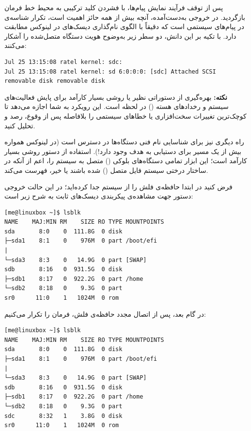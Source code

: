 پس از توقف فرآیند نمایش پیام‌ها، با فشردن کلید ترکیبی  به محیط خط فرمان بازگردید. در خروجی به‌دست‌آمده، آنچه بیش از همه حائز اهمیت است، تکرار شناسه‌ی \cmd{[sdc]} در پیام‌های سیستمی است که دقیقاً با الگوی نام‌گذاری دیسک‌های  در لینوکس مطابقت دارد. با تکیه بر این دانش، دو سطر زیر به‌وضوح هویت دستگاه متصل‌شده را آشکار می‌کنند:

\begin{latin}
\begin{lstlisting}
Jul 25 13:15:08 ratel kernel: sdc:
Jul 25 13:15:08 ratel kernel: sd 6:0:0:0: [sdc] Attached SCSI
removable disk removable disk
\end{lstlisting}
\end{latin}

\begin{note}
\textbf{نکته:} بهره‌گیری از دستوراتی نظیر  یا  روشی بسیار کارآمد برای پایش فعالیت‌های سیستم و رخدادهای هسته () در لحظه است. این رویکرد به شما اجازه می‌دهد تا کوچک‌ترین تغییرات سخت‌افزاری یا خطاهای سیستمی را بلافاصله پس از وقوع، رصد و تحلیل کنید.
\end{note}

راه دیگری نیز برای شناسایی نام فنی دستگاه‌ها در دسترس است (در لینوکس همواره بیش از یک مسیر برای دستیابی به هدف وجود دارد!). استفاده از دستور  روشی بسیار کارآمد است؛ این ابزار تمامی دستگاه‌های بلوکی () متصل به سیستم را، اعم از آنکه در ساختار درختی سیستم فایل متصل () شده باشند یا خیر، فهرست می‌کند.

فرض کنید در ابتدا حافظه‌ی فلش را از سیستم جدا کرده‌اید؛ در این حالت خروجی دستور جهت مشاهده‌ی پیکربندی دیسک‌های ثابت به شرح زیر است:

\begin{latin}
\begin{lstlisting}
[me@linuxbox ~]$ lsblk
NAME    MAJ:MIN RM    SIZE RO TYPE MOUNTPOINTS
sda       8:0    0  111.8G  0 disk
├─sda1    8:1    0    976M  0 part /boot/efi
|
└─sda3    8:3    0   14.9G  0 part [SWAP]
sdb       8:16   0  931.5G  0 disk
├─sdb1    8:17   0  922.2G  0 part /home
└─sdb2    8:18   0    9.3G  0 part
sr0      11:0    1   1024M  0 rom
\end{lstlisting}
\end{latin}

در گام بعد، پس از اتصال مجدد حافظه‌ی فلش، فرمان  را تکرار می‌کنیم:

\begin{latin}
\begin{lstlisting}
[me@linuxbox ~]$ lsblk
NAME    MAJ:MIN RM    SIZE RO TYPE MOUNTPOINTS
sda       8:0    0  111.8G  0 disk
├─sda1    8:1    0    976M  0 part /boot/efi
|
└─sda3    8:3    0   14.9G  0 part [SWAP]
sdb       8:16   0  931.5G  0 disk
├─sdb1    8:17   0  922.2G  0 part /home
└─sdb2    8:18   0    9.3G  0 part
sdc       8:32   1    3.8G  0 disk
sr0      11:0    1   1024M  0 rom
\end{lstlisting}
\end{latin}

